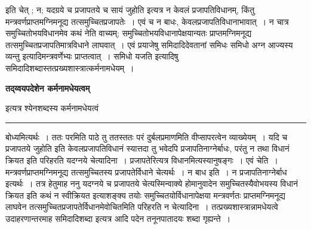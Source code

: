 \documentclass[11pt, openany]{book}
\begin{document}
\newpage
\fancyhead[LO]{तद्य्वप०कर्म०धेयत्वम् ]}
{\bl{} इति चेत् ; न; {\qtl यदग्रये च प्रजापतये  च सायं जुहोति}  इत्यत्र न केवलं प्रजापतिविधानम्, किंतु मन्त्रवर्णप्राप्तमग्निमनूद्य तत्समुच्चितप्रजापतेः~। एवं च न बाधः,  केवलप्रजापतिविधानाभावात्~। न चात्र समुच्चितोभयविधानमेव  कथं नेति वाच्यम्; समुच्चितोभयविधानापेक्षयान्यतः प्राप्तमग्निमनूद्य तत्समुच्चितप्रजापतिमात्रविधाने लाघवात्~। एवं प्रयाजेषु समिदादिदेवतानां {\qtl समिधः समिधो अग्न आज्यस्य व्यन्तु}  इत्यादिमन्त्रवर्णेभ्यः प्राप्तत्वात्~। {\qtl समिधो यजति}  इत्यादिषु समिदादिशब्दास्तत्प्रख्यशास्त्रात्कर्मनामधेयम्~।}
\begin{center}
 \textbf{तद्य्वयपदेशेन कर्मनामधेयत्वम् }   
\end{center}
 
{  इत्यत्र श्येनशब्दस्य कर्मनामधेयत्वं }\\
\hrule
\vspace{3mm}
\noindent
बोध्यमित्यर्थः~। ततः परमिति पाठे तु ततस्ततः परं दुर्बलप्रमाणमिति वीप्सापरत्वेन व्याख्येयम्~। यदि च {\qt प्रजापतये जुहोति} इति केवलप्रजापतिविधानं स्यात्तदा तु भवेदपि प्रजापतिनाग्नेर्बाधः, परंतु न तथा विधानं क्रियत इति परिहरति {\br यदग्नये चेत्यादिना~।} प्रजापतेरित्यत्र विधानमित्यस्यानुषङ्गः~।  {\br एवं चेति~।} मन्त्रवर्णप्राप्तमग्निमनूद्य तत्समुच्चितस्य प्रजापतेर्विधाने चेत्यर्थः~। {\br न बाध इति~।} न प्रजापतिनाग्नेर्बाध इत्यर्थः~। तत्र हेतुमाह {\br ननु} यदग्नये च प्रजापतये चेत्यस्मिन्वाक्ये होमानुवादेन समुच्चितस्यैवोभयस्य  विधानं क्रियत इति कथं न स्वीक्रियत इत्याशङ्क्य तयोः समुच्चितयोर्विधानापेक्षया मन्त्रवर्णतः प्राप्तमग्निमनूद्य लाघवेन
तत्समुच्चितप्रजापतेर्विधानमेवोचितमिति परिहरति {\br न चेत्यादिना~।} तत्प्रख्यशास्त्रान्नामधेयत्वे उदाहरणान्तरमाह समिदादिशब्दा इत्यत्र {\qt आदि}  पदेन तनूनपातादयः शब्दा गृह्यन्ते~।\\
\end{document}
